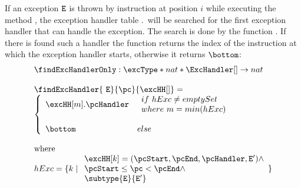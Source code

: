  If an exception $\mbox{\rm\texttt{E}}$ is thrown by instruction at position $i$ while executing the method \methodd,
 the exception handler table  \methodd.\excHandlerTable \ will be searched for the first exception handler that can handle the exception. 
 The search is done by the function \findExcHandlerOnly. If there is found
 such a handler the function returns the index of the instruction at which the exception handler starts, otherwise it returns $\bottom$:
 $$ \begin{array}{l}
        \findExcHandlerOnly : \excType * nat * \ExcHandler[] \rightarrow nat \\
	\\
	\findExcHandler{ \mbox{ \rm \texttt{E}} }{\pc}{\excHH[]} = \\
	 \left\{\begin{array}{ll}
	     \excHH[m].\pcHandler & \begin{array}{l}
	          		         if  \  hExc \neq emptySet \\
					 where \  m = min( hExc ) 
			            \end{array}	 \\
			   & \\
	     \bottom &  else %
	 \end{array}\right. \\
\\ 
 \rm{where } \\  
  hExc = \{ k  \mid  \begin{array}{l} 
                        \excHH[k] = (\pcStart,\pcEnd,\pcHandler, \mbox{\rm\texttt{E}}' ) \wedge  \\
                        \pcStart \leq \pc < \pcEnd \wedge \\
			 \subtype{\mbox{\rm\texttt{E}}}{\mbox{\rm\texttt{E}}'} 
                    \end{array} \}
   \end{array}	  
 $$
